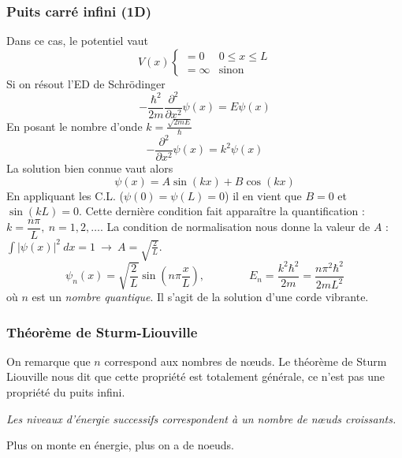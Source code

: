 	\subsubsection{Puits carré infini (1D)}
Dans ce cas, le potentiel vaut
\begin{equation}
V(x) \left\{\begin{array}{ll}
= 0 &0\leq x\leq L\\
=\infty & \text{sinon}
\end{array}\right.
\end{equation}
Si on résout l'ED de Schrödinger
\begin{equation}
-\frac{\hbar^2}{2m}\frac{\partial^2}{\partial x^2}\psi(x) = E\psi(x)
\end{equation}
En posant le nombre d'onde $k=\frac{\sqrt{2mE}}{\hbar}$
\begin{equation}
-\frac{\partial^2}{\partial x^2}\psi(x) = k^2\psi(x)
\end{equation}
La solution bien connue vaut alors
\begin{equation}
\psi(x) = A\sin(kx) + B\cos(kx)
\end{equation}
En appliquant les C.L. ($\psi(0)=\psi(L)=0$) il en vient que $B=0$ et $\sin(kL)=0$. Cette 
dernière condition fait apparaître la quantification : $k=\dfrac{n\pi}{L},\ n=1,2,\dots$. 
La condition de normalisation nous donne la valeur de $A$ : $\int |\psi(x)|^2\ dx = 1\ \longrightarrow\ 
A = \sqrt{\frac{2}{L}}$.
\begin{equation}
\psi_n(x) =\sqrt{\frac{2}{L}}\sin\left(n\pi\frac{x}{L}\right),\qquad\qquad E_n=\frac{k^2\hbar^2}{2m}=
\frac{n\pi^2\hbar^2}{2mL^2}
\end{equation}
où $n$ est un \textit{nombre quantique}. Il s'agit de la solution d'une corde vibrante. 
		
		\subsubsection{Théorème de Sturm-Liouville}
		On remarque que $n$ correspond aux nombres de nœuds. Le théorème de Sturm Liouville nous dit que 
		cette propriété est totalement générale, ce n'est pas une propriété du puits infini.
		
		\begin{center}
		  \textit{Les niveaux d'énergie 
successifs correspondent à un nombre de nœuds croissants.}
		 \end{center} 
		 Plus on monte en énergie, plus on a de noeuds.\\

